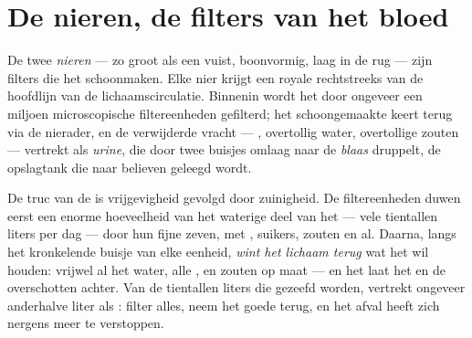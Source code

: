 \section{De nieren, de filters van het bloed}

\begin{definition}\label{def:g7:removing-wastes:kidneys}
De twee \emph{nieren} --- zo groot als een vuist, boonvormig,
laag in de rug --- zijn filters die het  schoonmaken. Elke nier
krijgt een royale  rechtstreeks van de hoofdlijn van de
lichaamscirculatie. Binnenin wordt het  door ongeveer een miljoen
microscopische filtereenheden gefilterd; het schoongemaakte  keert
terug via de nierader, en de verwijderde vracht --- , overtollig
water, overtollige zouten --- vertrekt als \emph{urine}, die
door twee buisjes omlaag naar de \emph{blaas} druppelt, de
opslagtank die naar believen geleegd wordt.
\end{definition}

\begin{proposition}\label{prop:g7:removing-wastes:filter}
De truc van de  is vrijgevigheid gevolgd door zuinigheid. De
filtereenheden duwen eerst een enorme hoeveelheid van het waterige deel
van het  --- vele tientallen liters per dag --- door hun fijne zeven,
met , suikers, zouten en al. Daarna, langs het kronkelende buisje van
elke eenheid, \emph{wint het lichaam terug} wat het wil houden:
vrijwel al het water, alle , en zouten op maat --- en het laat het
 en de overschotten achter. Van de tientallen liters die gezeefd
worden, vertrekt ongeveer anderhalve liter als : filter alles, neem
het goede terug, en het afval heeft zich nergens meer te verstoppen.
\end{proposition}
\admitted

